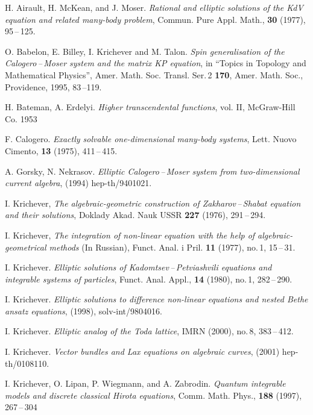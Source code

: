 \documentclass[a4paper,11pt]{article}
\theoremstyle{plain}
\theoremstyle{remark}
\begin{document}
\begin{thebibliography}{9}

 H. Airault, H. McKean, and J. Moser.
\emph{Rational and elliptic solutions of the KdV equation and
related many-body problem},
Commun. Pure Appl. Math., {\bf 30} (1977), 95\,--\,125.

 O. Babelon, E. Billey, I. Krichever and M. Talon.
\emph{Spin generalisation of the Calogero\,--\,Moser system and the
matrix KP equation}, in ``Topics in Topology and Mathematical Physics'',
Amer. Math. Soc. Transl. Ser.\,2 {\bfseries 170},
Amer. Math. Soc., Providence, 1995, 83\,--119.

 H. Bateman, A. Erdelyi.
\emph{Higher transcendental functions},
vol. II, McGraw-Hill Co. 1953

 F. Calogero.
\emph{Exactly solvable one-dimensional many-body systems},
Lett. Nuovo Cimento, {\bf 13} (1975), 411\,--\,415.

 A. Gorsky, N. Nekrasov.
\emph{Elliptic Calogero\,--\,Moser system from two-dimensional
current algebra}, (1994) hep-th/9401021.

 I. Krichever,
\emph{The algebraic-geometric construction of Zakharov\,--\,Shabat
equation and their solutions},
Doklady Akad. Nauk USSR {\bf 227} (1976), 291\,--\,294.

 I. Krichever,
\emph{The integration of non-linear equation with the help
of algebraic-geometrical methods} (In Russian),
Funct. Anal. i Pril. {\bfseries 11} (1977), no.\,1, 15\,--\,31.

 I. Krichever.
\emph{Elliptic solutions of Kadomtsev\,--\,Petviashvili equations and
integrable systems of particles},
Funct. Anal. Appl., {\bf 14} (1980), no.\,1, 282\,--\,290.

 I. Krichever.
\emph{Elliptic solutions to difference non-linear equations and
nested Bethe ansatz equations}, (1998), solv-int/9804016.

 I. Krichever.
\emph{Elliptic analog of the Toda lattice},
IMRN (2000), no.\,8, 383\,--\,412.

 I. Krichever.
\emph{Vector bundles and Lax equations on algebraic curves},
(2001) hep-th/0108110.

 I. Krichever, O. Lipan, P. Wiegmann, and A. Zabrodin.
\emph{Quantum integrable models and discrete classical Hirota equations},
Comm. Math. Phys., {\bfseries 188} (1997), 267\,--\,304


\end{thebibliography}
\end{document}
